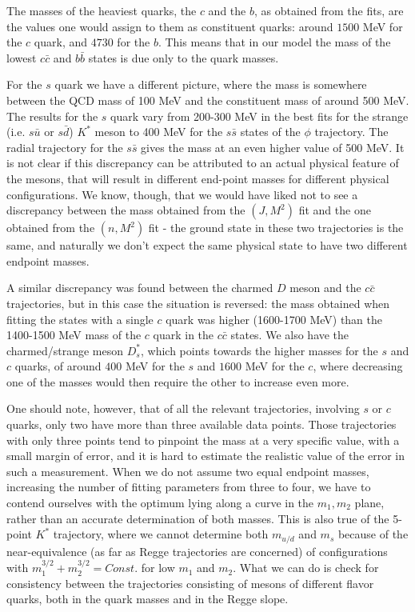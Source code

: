 \documentclass[11pt,a4]{article}
\newcommand{\ssb}{s\bar{s}}
\newcommand{\ccb}{c\bar{c}}
\newcommand{\bbb}{b\bar{b}}
\newcommand{\mud}{m_{u/d}}
\begin{document}
The masses of the heaviest quarks, the \(c\) and the \(b\), as obtained from the fits, are the values one would assign to them as constituent quarks: around \(1500\) MeV for the \(c\) quark, and \(4730\) for the \(b\). This means that in our model the mass of the lowest \(\ccb\) and \(\bbb\) states is due only to the quark masses.


For the \(s\) quark we have a different picture, where the mass is somewhere between the QCD mass of 100 MeV and the constituent mass of around 500 MeV. The results for the \(s\) quark vary from 200-300 MeV in the best fits for the strange (i.e. \(s\bar{u}\) or \(s\bar{d}\)) \(K^*\) meson to 400 MeV for the \(\ssb\) states of the \(\phi\) trajectory. The radial trajectory for the \(\ssb\) gives the mass at an even higher value of 500 MeV. It is not clear if this discrepancy can be attributed to an actual physical feature of the mesons, that will result in different end-point masses for different physical configurations. We know, though, that we would have liked not to see a discrepancy between the mass obtained from the \((J,M^2)\) fit and the one obtained from the \((n,M^2)\) fit - the ground state in these two trajectories is the same, and naturally we don't expect the same physical state to have two different endpoint masses.


A similar discrepancy was found between the charmed \(D\) meson and the \(\ccb\) trajectories, but in this case the situation is reversed: the mass obtained when fitting the states with a single \(c\) quark was higher (1600-1700 MeV) than the 1400-1500 MeV mass of the \(c\) quark in the \(\ccb\) states. We also have the charmed/strange meson \(D^*_s\), which points towards the higher masses for the \(s\) and \(c\) quarks, of around \(400\) MeV for the \(s\) and \(1600\) MeV for the \(c\), where decreasing one of the masses would then require the other to increase even more.


One should note, however, that of all the relevant trajectories, involving \(s\) or \(c\) quarks, only two have more than three available data points. Those trajectories with only three points tend to pinpoint the mass at a very specific value, with a small margin of error, and it is hard to estimate the realistic value of the error in such a measurement. When we do not assume two equal endpoint masses, increasing the number of fitting parameters from three to four, we have to contend ourselves with the optimum lying along a curve in the \(m_1,m_2\) plane, rather than an accurate determination of both masses. This is also true of the 5-point \(K^*\) trajectory, where we cannot determine both \(\mud\) and \(m_s\) because of the near-equivalence (as far as Regge trajectories are concerned) of configurations with \(m_1^{3/2}+m_2^{3/2} = Const.\) for low \(m_1\) and \(m_2\). What we can do is check for consistency between the trajectories consisting of mesons of different flavor quarks, both in the quark masses and in the Regge slope.
\end{document}
